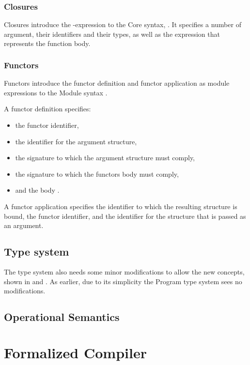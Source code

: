 \subsubsection{Closures}
Closures introduce the \cmath{\lambda}-expression to the Core syntax, .
It specifies a number of argument, their identifiers and their types, as well as the expression that represents the function body.


\vspace{-1em} %
\subsubsection{Functors}
Functors introduce the functor definition and functor application as module expressions to the Module syntax .

A functor definition specifies:
\begin{itemize}
\item the functor identifier,
\item the identifier  for the argument structure,
\item the signature  to which the argument structure must comply,
\item the signature  to which the functors body must comply,
\item and the body .
\end{itemize}
A functor application specifies the identifier to which the resulting structure is bound, the functor identifier, and the identifier for the structure that is passed as an argument.


\subsection{Type system}
The type system also needs some minor modifications to allow the new concepts, shown in  and . As earlier, due to its simplicity the Program type system sees no modifications.


\subsection{Operational Semantics}

\section{Formalized Compiler}
\label{sec:formalizedcompiler2}
